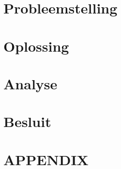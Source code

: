 \documentclass[twoside,a4paper]{article}
\begin{document}
\section{Probleemstelling}


\section{Oplossing}


\section{Analyse}


\newpage
\section{Besluit}


\newpage
\appendix
\section{APPENDIX}


\clearpage

% 

\end{document}
